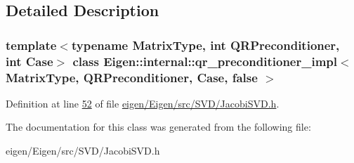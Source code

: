 \subsection{Detailed Description}
\subsubsection*{template$<$typename Matrix\+Type, int Q\+R\+Preconditioner, int Case$>$\newline
class Eigen\+::internal\+::qr\+\_\+preconditioner\+\_\+impl$<$ Matrix\+Type, Q\+R\+Preconditioner, Case, false $>$}



Definition at line \hyperlink{eigen_2_eigen_2src_2_s_v_d_2_jacobi_s_v_d_8h_source_l00052}{52} of file \hyperlink{eigen_2_eigen_2src_2_s_v_d_2_jacobi_s_v_d_8h_source}{eigen/\+Eigen/src/\+S\+V\+D/\+Jacobi\+S\+V\+D.\+h}.



The documentation for this class was generated from the following file\+:\begin{DoxyCompactItemize}
\item 
eigen/\+Eigen/src/\+S\+V\+D/\+Jacobi\+S\+V\+D.\+h\end{DoxyCompactItemize}
